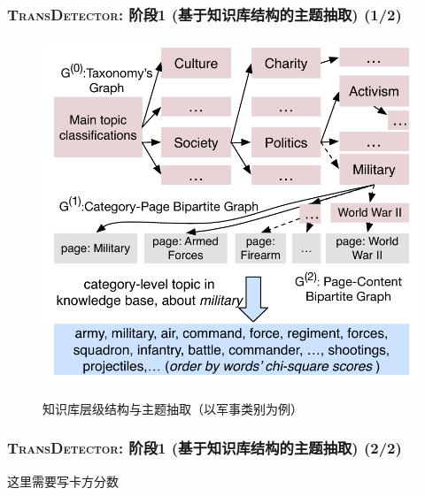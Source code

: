 \begin{frame}
\frametitle{\textsc{TransDetector}: 阶段1 (基于知识库结构的主题抽取) (1/2)}	
\vspace{-4mm}
\begin{figure}[h]
		\setlength{\abovecaptionskip}{0.cm}
        \setlength{\belowcaptionskip}{0.cm}
        \centering
		\caption{知识库层级结构与主题抽取（以军事类别为例）}
        \includegraphics[width=0.6\columnwidth]{img/initializationExample.pdf}
        \label{fig:hood}
\end{figure}
\end{frame}

\begin{frame}
\frametitle{\textsc{TransDetector}: 阶段1 (基于知识库结构的主题抽取) (2/2)}	
这里需要写卡方分数
\end{frame}

